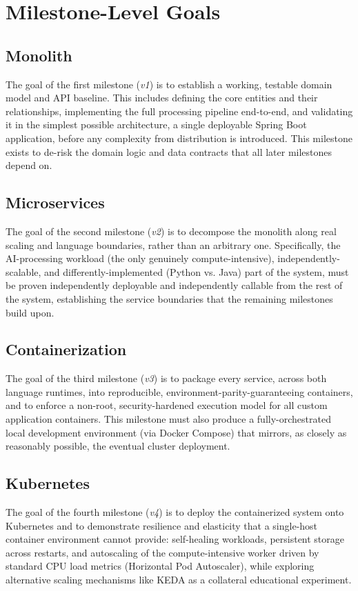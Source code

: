 \documentclass[twoside]{supsistudent}
\begin{document}
\section{Milestone-Level Goals}

\subsection{Monolith}
The goal of the first milestone (\emph{v1}) is to establish a working, testable domain model and API baseline. This includes defining the core entities and their relationships, implementing the full processing pipeline end-to-end, and validating it in the simplest possible architecture, a single deployable Spring Boot application, before any complexity from distribution is introduced. This milestone exists to de-risk the domain logic and data contracts that all later milestones depend on.

\subsection{Microservices}
The goal of the second milestone (\emph{v2}) is to decompose the monolith along real scaling and language boundaries, rather than an arbitrary one. Specifically, the AI-processing workload (the only genuinely compute-intensive), independently-scalable, and differently-implemented (Python vs. Java) part of the system, must be proven independently deployable and independently callable from the rest of the system, establishing the service boundaries that the remaining milestones build upon.

\subsection{Containerization}
The goal of the third milestone (\emph{v3}) is to package every service, across both language runtimes, into reproducible, environment-parity-guaranteeing containers, and to enforce a non-root, security-hardened execution model for all custom application containers. This milestone must also produce a fully-orchestrated local development environment (via Docker Compose) that mirrors, as closely as reasonably possible, the eventual cluster deployment.

\subsection{Kubernetes}
The goal of the fourth milestone (\emph{v4}) is to deploy the containerized system onto Kubernetes and to demonstrate resilience and elasticity that a single-host container environment cannot provide: self-healing workloads, persistent storage across restarts, and autoscaling of the compute-intensive worker driven by standard CPU load metrics (Horizontal Pod Autoscaler), while exploring alternative scaling mechanisms like KEDA as a collateral educational experiment.
\end{document}
